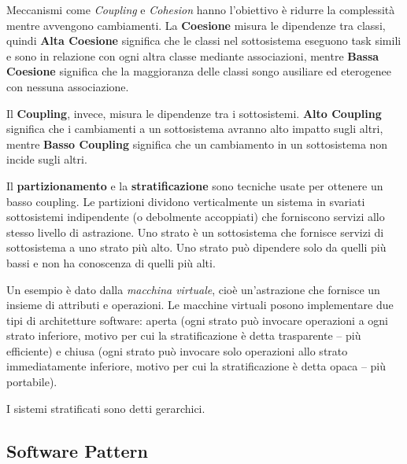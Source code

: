\documentclass{article}
\begin{document}
        Meccanismi come \textit{Coupling} e \textit{Cohesion} hanno l’obiettivo è ridurre la complessità mentre avvengono cambiamenti. La \textbf{Coesione} misura le dipendenze tra classi, quindi \textbf{Alta Coesione} significa che le classi nel sottosistema eseguono  task simili e sono in relazione con ogni altra classe mediante associazioni, mentre \textbf{Bassa Coesione} significa che la maggioranza delle classi songo ausiliare ed eterogenee con nessuna associazione. 
        
        \vspace{3mm}
        
        Il \textbf{Coupling}, invece, misura le dipendenze tra i sottosistemi.\textbf{ Alto Coupling} significa che i cambiamenti a un sottosistema avranno alto impatto sugli altri, mentre \textbf{Basso Coupling} significa che un cambiamento in un sottosistema non incide sugli altri.
        
        \vspace{3mm}
        
        Il \textbf{partizionamento} e la \textbf{stratificazione} sono tecniche usate per ottenere un basso coupling. Le partizioni dividono verticalmente un sistema in svariati sottosistemi indipendente (o debolmente accoppiati) che forniscono servizi allo stesso livello di astrazione. Uno strato è un sottosistema che fornisce servizi di sottosistema a uno strato più alto. Uno strato può dipendere solo da quelli più bassi e non ha conoscenza di quelli più alti.
        
        \vspace{3mm}
        
        Un esempio è dato dalla \textit{macchina virtuale}, cioè un’astrazione che fornisce un insieme di attributi e operazioni. Le macchine virtuali posono implementare due tipi di architetture software: aperta  (ogni strato può invocare operazioni a ogni strato inferiore, motivo per cui la stratificazione è detta trasparente – più efficiente) e chiusa (ogni strato può invocare solo operazioni allo strato immediatamente inferiore, motivo per cui la stratificazione è detta opaca – più portabile). 
        
        \vspace{3mm}
        
        I sistemi stratificati sono detti gerarchici.
    
        \subsection{Software Pattern}
    
\end{document}
